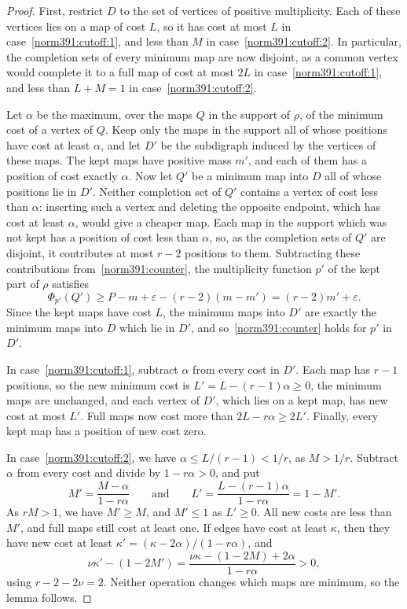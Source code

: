 \begin{proof}
First, restrict $D$ to the set of vertices of positive multiplicity. Each of these vertices lies on a map of cost $L$, so it has cost at most $L$ in case~\ref{norm391:cutoff:1}, and less than $M$ in case~\ref{norm391:cutoff:2}. In particular, the completion sets of every minimum map are now disjoint, as a common vertex would complete it to a full map of cost at most $2L$ in case~\ref{norm391:cutoff:1}, and less than $L+M=1$ in case~\ref{norm391:cutoff:2}.

Let $\alpha$ be the maximum, over the maps $Q$ in the support of $\rho$, of the minimum cost of a vertex of $Q$. Keep only the maps in the support all of whose positions have cost at least $\alpha$, and let $D'$ be the subdigraph induced by the vertices of these maps. The kept maps have positive mass $m'$, and each of them has a position of cost exactly $\alpha$.
Now let $Q'$ be a minimum map into $D$ all of whose positions lie in $D'$. Neither completion set of $Q'$ contains a vertex of cost less than $\alpha$: inserting such a vertex and deleting the opposite endpoint, which has cost at least $\alpha$, would give a cheaper map. Each map in the support which was not kept has a position of cost less than $\alpha$, so, as the completion sets of $Q'$ are disjoint, it contributes at most $r-2$ positions to them. Subtracting these contributions from~\eqref{norm391:counter}, the multiplicity function $p'$ of the kept part of $\rho$ satisfies
\[
\Phi_{p'}(Q')\ge P-m+\varepsilon-(r-2)(m-m')=(r-2)m'+\varepsilon.
\]
Since the kept maps have cost $L$, the minimum maps into $D'$ are exactly the minimum maps into $D$ which lie in $D'$, and so~\eqref{norm391:counter} holds for $p'$ in $D'$.

In case~\ref{norm391:cutoff:1}, subtract $\alpha$ from every cost in $D'$. Each map has $r-1$ positions, so the new minimum cost is $L'=L-(r-1)\alpha\ge0$, the minimum maps are unchanged, and each vertex of $D'$, which lies on a kept map, has new cost at most $L'$. Full maps now cost more than $2L-r\alpha\ge2L'$. Finally, every kept map has a position of new cost zero.

In case~\ref{norm391:cutoff:2}, we have $\alpha\le L/(r-1)<1/r$, as $M>1/r$. Subtract $\alpha$ from every cost and divide by $1-r\alpha>0$, and put
\[
 M'=\frac{M-\alpha}{1-r\alpha}\qquad\text{and}\qquad
 L'=\frac{L-(r-1)\alpha}{1-r\alpha}=1-M'.
\]
As $rM>1$, we have $M'\ge M$, and $M'\le1$ as $L'\ge0$. All new costs are less than $M'$, and full maps still cost at least one. If edges have cost at least $\kappa$, then they have new cost at least $\kappa'=(\kappa-2\alpha)/(1-r\alpha)$, and
\[
 \nu\kappa'-(1-2M')
 =\frac{\nu\kappa-(1-2M)+2\alpha}{1-r\alpha}>0,
\]
using $r-2-2\nu=2$. Neither operation changes which maps are minimum, so the lemma follows.
\end{proof}

